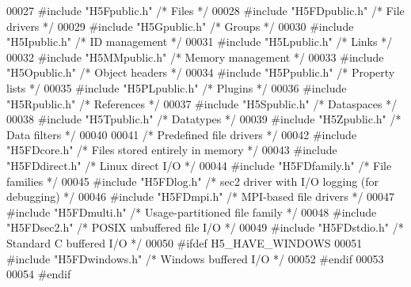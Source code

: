 \begin{DoxyCode}
00027 \textcolor{preprocessor}{#include "H5Fpublic.h"}      \textcolor{comment}{/* Files                */}
00028 \textcolor{preprocessor}{#include "H5FDpublic.h"}     \textcolor{comment}{/* File drivers             */}
00029 \textcolor{preprocessor}{#include "H5Gpublic.h"}      \textcolor{comment}{/* Groups               */}
00030 \textcolor{preprocessor}{#include "H5Ipublic.h"}      \textcolor{comment}{/* ID management            */}
00031 \textcolor{preprocessor}{#include "H5Lpublic.h"}      \textcolor{comment}{/* Links                */}
00032 \textcolor{preprocessor}{#include "H5MMpublic.h"}     \textcolor{comment}{/* Memory management            */}
00033 \textcolor{preprocessor}{#include "H5Opublic.h"}      \textcolor{comment}{/* Object headers           */}
00034 \textcolor{preprocessor}{#include "H5Ppublic.h"}      \textcolor{comment}{/* Property lists           */}
00035 \textcolor{preprocessor}{#include "H5PLpublic.h"}     \textcolor{comment}{/* Plugins           */}
00036 \textcolor{preprocessor}{#include "H5Rpublic.h"}      \textcolor{comment}{/* References               */}
00037 \textcolor{preprocessor}{#include "H5Spublic.h"}      \textcolor{comment}{/* Dataspaces               */}
00038 \textcolor{preprocessor}{#include "H5Tpublic.h"}      \textcolor{comment}{/* Datatypes                */}
00039 \textcolor{preprocessor}{#include "H5Zpublic.h"}      \textcolor{comment}{/* Data filters             */}
00040 
00041 \textcolor{comment}{/* Predefined file drivers */}
00042 \textcolor{preprocessor}{#include "H5FDcore.h"}       \textcolor{comment}{/* Files stored entirely in memory  */}
00043 \textcolor{preprocessor}{#include "H5FDdirect.h"}         \textcolor{comment}{/* Linux direct I/O         */}
00044 \textcolor{preprocessor}{#include "H5FDfamily.h"}     \textcolor{comment}{/* File families            */}
00045 \textcolor{preprocessor}{#include "H5FDlog.h"}            \textcolor{comment}{/* sec2 driver with I/O logging (for debugging) */}
00046 \textcolor{preprocessor}{#include "H5FDmpi.h"}            \textcolor{comment}{/* MPI-based file drivers       */}
00047 \textcolor{preprocessor}{#include "H5FDmulti.h"}      \textcolor{comment}{/* Usage-partitioned file family    */}
00048 \textcolor{preprocessor}{#include "H5FDsec2.h"}       \textcolor{comment}{/* POSIX unbuffered file I/O        */}
00049 \textcolor{preprocessor}{#include "H5FDstdio.h"}      \textcolor{comment}{/* Standard C buffered I/O      */}
00050 \textcolor{preprocessor}{#ifdef H5\_HAVE\_WINDOWS}
00051 \textcolor{preprocessor}{#include "H5FDwindows.h"}        \textcolor{comment}{/* Windows buffered I/O     */}
00052 \textcolor{preprocessor}{#endif}
00053 
00054 \textcolor{preprocessor}{#endif}
\end{DoxyCode}
